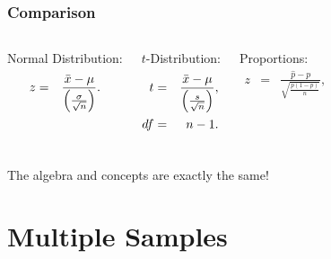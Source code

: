 \begin{frame}
  \frametitle{Comparison}

  \begin{columns}
    Normal Distribution:
    \begin{eqnarray*}
      z &  = & \frac{\bar{x}-\mu}{\left( \frac{\sigma}{\sqrt{n}} \right)}.
    \end{eqnarray*}

    $t$-Distribution:
    \begin{eqnarray*}
      t &  = & \frac{\bar{x}-\mu}{\left( \frac{s}{\sqrt{n}} \right)}, \\
      df & = & n-1.
    \end{eqnarray*}

    Proportions:
    \begin{eqnarray*}
      z & = & \frac{\hat{p}-p}{\sqrt{\frac{p(1-p)}{n}}},
    \end{eqnarray*}


  \end{columns}

  \vfill

    {
      \begin{center}
        The algebra and concepts are exactly the same!
      \end{center}
    }

    \vfill
  

\end{frame}


\section{Multiple Samples}


